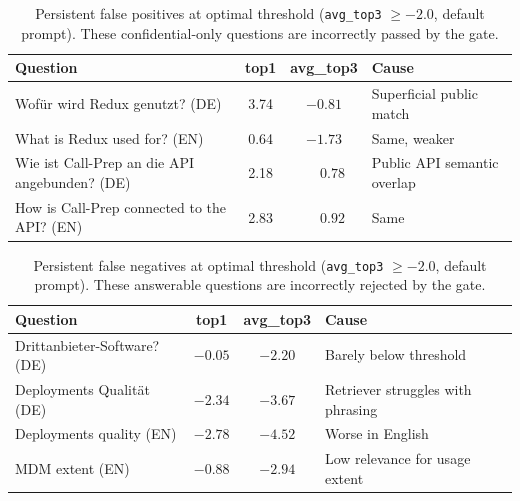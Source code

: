
\begin{table}[htbp]
\centering
\caption{Persistent false positives at optimal threshold (\texttt{avg\_top3} $\geq -2.0$, default prompt). These confidential-only questions are incorrectly passed by the gate.}
\label{tab:cg-false-positives}
\begin{tabular}{lccl}
\toprule
Question & top1 & avg\_top3 & Cause \\
\midrule
Wofür wird Redux genutzt? (DE)              &  3.74 & $-0.81$ & Superficial public match \\
What is Redux used for? (EN)                 &  0.64 & $-1.73$ & Same, weaker \\
Wie ist Call-Prep an die API angebunden? (DE) &  2.18 & $\phantom{-}0.78$ & Public API semantic overlap \\
How is Call-Prep connected to the API? (EN)  &  2.83 & $\phantom{-}0.92$ & Same \\
\bottomrule
\end{tabular}
\end{table}



\begin{table}[htbp]
\centering
\caption{Persistent false negatives at optimal threshold (\texttt{avg\_top3} $\geq -2.0$, default prompt). These answerable questions are incorrectly rejected by the gate.}
\label{tab:cg-false-negatives}
\begin{tabular}{lccl}
\toprule
Question & top1 & avg\_top3 & Cause \\
\midrule
Drittanbieter-Software? (DE)          & $-0.05$ & $-2.20$ & Barely below threshold \\
Deployments Qualität (DE)             & $-2.34$ & $-3.67$ & Retriever struggles with phrasing \\
Deployments quality (EN)              & $-2.78$ & $-4.52$ & Worse in English \\
MDM extent (EN)                       & $-0.88$ & $-2.94$ & Low relevance for usage extent \\
\bottomrule
\end{tabular}
\end{table}



